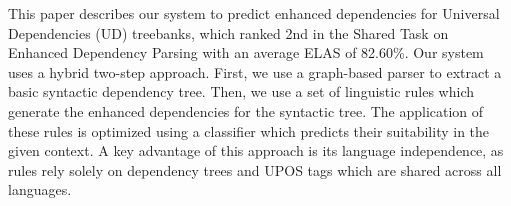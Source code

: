 This paper describes our system to predict enhanced dependencies for Universal Dependencies (UD) treebanks, which ranked 2nd in the Shared Task on Enhanced Dependency Parsing with an average ELAS of 82.60\%. Our system uses a hybrid two-step approach. First, we use a  graph-based parser to extract a basic syntactic dependency tree. Then, we use a set of linguistic rules which generate the enhanced dependencies for the syntactic tree. The application of these rules is optimized using a classifier which predicts their suitability in the given context. A key advantage of this approach is its language independence, as rules rely solely on dependency trees and UPOS tags which are shared across all languages.
